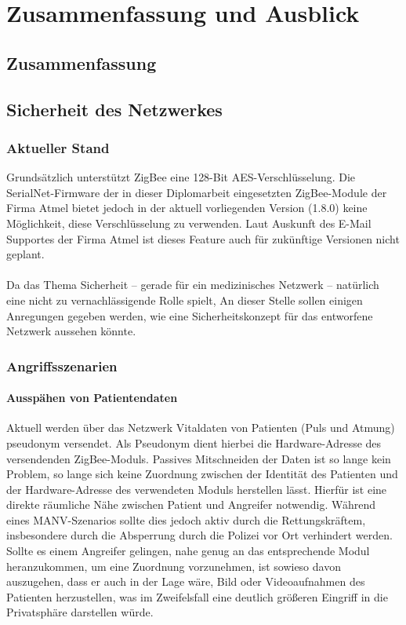 
\chapter{Zusammenfassung und Ausblick}

\section{Zusammenfassung}

\section{Sicherheit des Netzwerkes}
\label{Sicherheit}
\subsection{Aktueller Stand}
Grundsätzlich unterstützt ZigBee eine 128-Bit AES-Verschlüsselung. Die SerialNet-Firmware der in dieser Diplomarbeit
eingesetzten ZigBee-Module der Firma Atmel bietet jedoch in der aktuell vorliegenden Version (1.8.0) keine Möglichkeit,
diese Verschlüsselung zu verwenden. Laut Auskunft des E-Mail Supportes der Firma Atmel ist dieses Feature auch für
zukünftige Versionen nicht geplant.\\
\\
Da das Thema Sicherheit -- gerade für ein medizinisches Netzwerk -- natürlich eine nicht zu vernachlässigende Rolle spielt,
An dieser Stelle sollen einigen Anregungen gegeben werden, wie eine Sicherheitskonzept für das entworfene Netzwerk aussehen 
könnte.

\subsection{Angriffsszenarien}

\subsubsection{Ausspähen von Patientendaten}
Aktuell werden über das Netzwerk Vitaldaten von Patienten (Puls und Atmung) pseudonym versendet. Als Pseudonym dient 
hierbei die Hardware-Adresse des versendenden ZigBee-Moduls. Passives Mitschneiden der Daten ist so lange kein Problem,
so lange sich keine Zuordnung zwischen der Identität des Patienten und der Hardware-Adresse des verwendeten Moduls
herstellen lässt. Hierfür ist eine direkte räumliche Nähe zwischen Patient und Angreifer notwendig. 
Während eines MANV-Szenarios sollte dies jedoch aktiv durch die Rettungskräftem, insbesondere durch die Absperrung durch
die Polizei vor Ort verhindert werden. Sollte es einem Angreifer gelingen, nahe genug an das entsprechende Modul
heranzukommen, um eine Zuordnung vorzunehmen, ist sowieso davon auszugehen, dass er auch in der Lage wäre, Bild oder
Videoaufnahmen des Patienten herzustellen, was im Zweifelsfall eine deutlich größeren Eingriff in die Privatsphäre 
darstellen würde.

